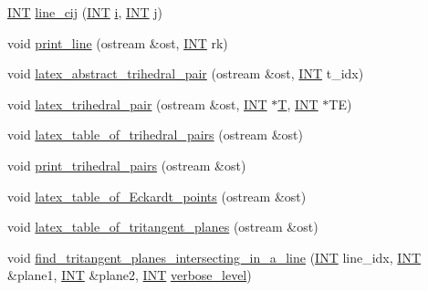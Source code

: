 \begin{DoxyCompactItemize}
\item 
\mbox{\hyperlink{galois_8h_a09fddde158a3a20bd2dcadb609de11dc}{I\+NT}} \mbox{\hyperlink{classsurface_accbf5729de8322d1e230f40144308218}{line\+\_\+cij}} (\mbox{\hyperlink{galois_8h_a09fddde158a3a20bd2dcadb609de11dc}{I\+NT}} \mbox{\hyperlink{alphabet2_8_c_acb559820d9ca11295b4500f179ef6392}{i}}, \mbox{\hyperlink{galois_8h_a09fddde158a3a20bd2dcadb609de11dc}{I\+NT}} \mbox{\hyperlink{alphabet2_8_c_a37d972ae0b47b9099e30983131d31916}{j}})
\item 
void \mbox{\hyperlink{classsurface_a3c3b2848519e60d214db736b4e397789}{print\+\_\+line}} (ostream \&ost, \mbox{\hyperlink{galois_8h_a09fddde158a3a20bd2dcadb609de11dc}{I\+NT}} rk)
\item 
void \mbox{\hyperlink{classsurface_a67161b031df3fdd60989e73ec3a9213e}{latex\+\_\+abstract\+\_\+trihedral\+\_\+pair}} (ostream \&ost, \mbox{\hyperlink{galois_8h_a09fddde158a3a20bd2dcadb609de11dc}{I\+NT}} t\+\_\+idx)
\item 
void \mbox{\hyperlink{classsurface_af05aa0ba4420eee9f859ac13010137ac}{latex\+\_\+trihedral\+\_\+pair}} (ostream \&ost, \mbox{\hyperlink{galois_8h_a09fddde158a3a20bd2dcadb609de11dc}{I\+NT}} $\ast$\mbox{\hyperlink{pentomino__5x5_8_c_a2b44a927c3e8a68f69f9f943c32c696d}{T}}, \mbox{\hyperlink{galois_8h_a09fddde158a3a20bd2dcadb609de11dc}{I\+NT}} $\ast$TE)
\item 
void \mbox{\hyperlink{classsurface_a4bf576800eeba169776d5c199a836cd4}{latex\+\_\+table\+\_\+of\+\_\+trihedral\+\_\+pairs}} (ostream \&ost)
\item 
void \mbox{\hyperlink{classsurface_a3af89c1a0ce86c3d68b5683493c7d919}{print\+\_\+trihedral\+\_\+pairs}} (ostream \&ost)
\item 
void \mbox{\hyperlink{classsurface_aacb80c9a1f6a77de3ab2bad12150c39a}{latex\+\_\+table\+\_\+of\+\_\+\+Eckardt\+\_\+points}} (ostream \&ost)
\item 
void \mbox{\hyperlink{classsurface_a36e371faec8bb246f04400307148744c}{latex\+\_\+table\+\_\+of\+\_\+tritangent\+\_\+planes}} (ostream \&ost)
\item 
void \mbox{\hyperlink{classsurface_ac2ec562235cc6d25620aa5244bd32260}{find\+\_\+tritangent\+\_\+planes\+\_\+intersecting\+\_\+in\+\_\+a\+\_\+line}} (\mbox{\hyperlink{galois_8h_a09fddde158a3a20bd2dcadb609de11dc}{I\+NT}} line\+\_\+idx, \mbox{\hyperlink{galois_8h_a09fddde158a3a20bd2dcadb609de11dc}{I\+NT}} \&plane1, \mbox{\hyperlink{galois_8h_a09fddde158a3a20bd2dcadb609de11dc}{I\+NT}} \&plane2, \mbox{\hyperlink{galois_8h_a09fddde158a3a20bd2dcadb609de11dc}{I\+NT}} \mbox{\hyperlink{simeon_8_c_a818073fbcc2f439e7c56952f67386122}{verbose\+\_\+level}})

\end{DoxyCompactItemize}
